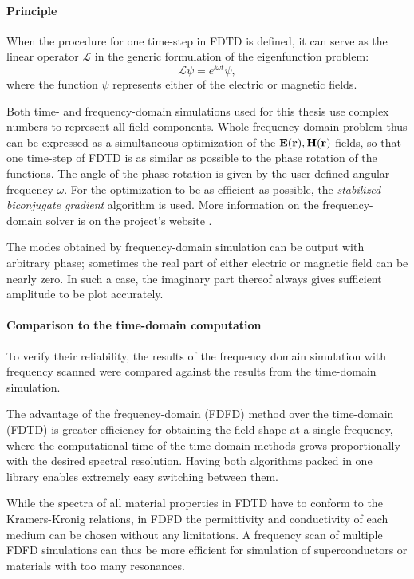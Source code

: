 \paragraph{Principle}  %
When the procedure for one time-step in FDTD is defined, it can serve as the linear operator $\mathcal L$ in the generic formulation of the eigenfunction problem:
$$\mathcal{L} \psi = e^{\ii \omega t} \psi,$$
where the function $\psi$ represents either of the electric or magnetic fields. 

Both time- and frequency-domain simulations used for this thesis use complex numbers to represent all field components.
Whole frequency-domain problem thus can be expressed as a simultaneous optimization of the $\mathbf{E}({\mathbf{r}}), \mathbf{H}({\mathbf{r}})$ fields, so that one time-step of FDTD is as similar as possible to the phase rotation of the functions. The angle of the phase rotation is given by the user-defined angular frequency $\omega$. For the optimization to be as efficient as possible, the \textit{stabilized biconjugate gradient} algorithm \cite{oskooi2010meep} is used. More information on the frequency-domain solver is on the project's website \cite{ab-initio}. 

The modes obtained by frequency-domain simulation can be output with arbitrary phase; sometimes the real part of either electric or magnetic field can be nearly zero. In such a case, the imaginary part thereof always gives sufficient amplitude to be plot accurately.

\paragraph{Comparison to the time-domain computation} %
To verify their reliability, the results of the frequency domain simulation with frequency scanned were compared against the results from the time-domain simulation. 

The advantage of the frequency-domain (FDFD) method over the time-domain (FDTD) is greater efficiency for obtaining the field shape at a single frequency, where the computational time of the time-domain methods grows proportionally with the desired spectral resolution. Having both algorithms packed in one library enables extremely easy switching between them. 

While the spectra of all material properties in FDTD have to conform to the Kramers-Kronig relations, in FDFD the permittivity and conductivity of each medium can be chosen without any limitations.
A frequency scan of multiple FDFD simulations can thus be more efficient for simulation of superconductors or materials with too many resonances.  

